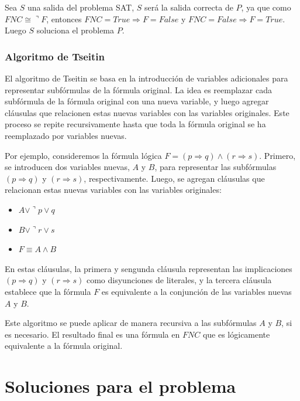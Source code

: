 \documentclass{article}
\begin{document}
            Sea $S$ una salida del problema SAT, $S$ será la salida correcta de $P$, ya que como $FNC \cong \urcorner F$, entonces 
            $FNC = True \Rightarrow  F = False$ y $FNC = False \Rightarrow F = True$. Luego $S$ soluciona el problema $P$.

        \subsubsection*{Algoritmo de Tseitin}
            El algoritmo de Tseitin se basa en la introducción de variables adicionales para representar 
            subfórmulas de la fórmula original. La idea es reemplazar cada subfórmula de la fórmula original 
            con una nueva variable, y luego agregar cláusulas que relacionen estas nuevas variables con las 
            variables originales. Este proceso se repite recursivamente hasta que toda la fórmula original se ha 
            reemplazado por variables nuevas.

            Por ejemplo, consideremos la fórmula lógica $F = (p \Rightarrow q) \wedge (r \Rightarrow s)$.
            Primero, se introducen dos variables nuevas, $A$ y $B$, para representar las subfórmulas $(p \Rightarrow q)$
            y $(r \Rightarrow s)$, respectivamente. Luego, se agregan cláusulas que relacionan estas nuevas 
            variables con las variables originales: 
            \begin{itemize}
                \item $A \vee \urcorner p \vee q$
                \item $B \vee \urcorner r \vee s$
                \item $F \equiv A \wedge B$
            \end{itemize}

            En estas cláusulas, la primera y sengunda cláusula representan las implicaciones
            $(p \Rightarrow q)$ y $(r \Rightarrow s)$ como disyunciones de literales, y la tercera
            cláusula establece que la fórmula $F$ es equivalente a la conjunción de las variables nuevas
            $A$ y $B$. 

            Este algoritmo se puede aplicar de manera recursiva a las subfórmulas $A$ y $B$, si es necesario.
            El resultado final es una fórmula en $FNC$ que es lógicamente equivalente a la fórmula original.
    
\section*{Soluciones para el problema}
\end{document}
